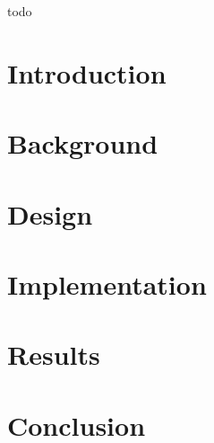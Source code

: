 \documentclass[12pt,twoside]{kau_report}
\begin{document}
\begin{frontmatter}
\begin{acknowledgements}
todo

\end{acknowledgements}
\cleardoublepage

  \tableofcontents
  \cleardoublepage

  \listoffigures
  \cleardoublepage

  \listoftables
  \cleardoublepage
  
  \lstlistoflistings
  \cleardoublepage

\end{frontmatter}

\section{Introduction}
\label{sec:introduction}

\cleardoublepage

\section{Background}
\label{sec:background}

\cleardoublepage

\section{Design}
\label{sec:design}

\cleardoublepage

\section{Implementation}
\label{sec:implementation}

\cleardoublepage

\section{Results} %
\label{sec:resultevaluation}

\cleardoublepage

\section{Conclusion}
\label{sec:conclusion}

\cleardoublepage
\end{document}
